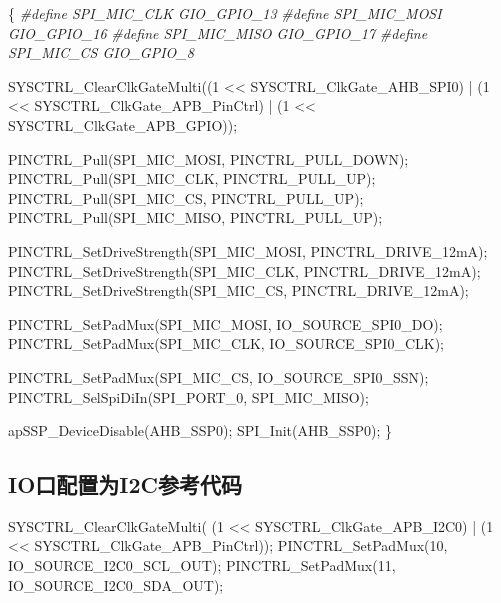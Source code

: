 \documentclass[
  12pt,
]{book}
\newenvironment{Shaded}{\begin{snugshade}}{\end{snugshade}}
\newcommand{\DecValTok}[1]{\textcolor[rgb]{0.00,0.00,0.81}{#1}}
\newcommand{\NormalTok}[1]{#1}
\newcommand{\PreprocessorTok}[1]{\textcolor[rgb]{0.56,0.35,0.01}{\textit{#1}}}
\begin{document}
\begin{Shaded}
\begin{Highlighting}[]
\NormalTok{\{}
  \PreprocessorTok{#define SPI_MIC_CLK         GIO_GPIO_13}
  \PreprocessorTok{#define SPI_MIC_MOSI        GIO_GPIO_16}
  \PreprocessorTok{#define SPI_MIC_MISO        GIO_GPIO_17}
  \PreprocessorTok{#define SPI_MIC_CS          GIO_GPIO_8}

\NormalTok{  SYSCTRL_ClearClkGateMulti((}\DecValTok{1}\NormalTok{ << SYSCTRL_ClkGate_AHB_SPI0)}
\NormalTok{                              | (}\DecValTok{1}\NormalTok{ << SYSCTRL_ClkGate_APB_PinCtrl)}
\NormalTok{                              | (}\DecValTok{1}\NormalTok{ << SYSCTRL_ClkGate_APB_GPIO));}

\NormalTok{  PINCTRL_Pull(SPI_MIC_MOSI, PINCTRL_PULL_DOWN);}
\NormalTok{  PINCTRL_Pull(SPI_MIC_CLK, PINCTRL_PULL_UP);}
\NormalTok{  PINCTRL_Pull(SPI_MIC_CS, PINCTRL_PULL_UP);}
\NormalTok{  PINCTRL_Pull(SPI_MIC_MISO, PINCTRL_PULL_UP);}

\NormalTok{  PINCTRL_SetDriveStrength(SPI_MIC_MOSI, PINCTRL_DRIVE_12mA);}
\NormalTok{  PINCTRL_SetDriveStrength(SPI_MIC_CLK, PINCTRL_DRIVE_12mA);}
\NormalTok{  PINCTRL_SetDriveStrength(SPI_MIC_CS, PINCTRL_DRIVE_12mA);}

\NormalTok{  PINCTRL_SetPadMux(SPI_MIC_MOSI, IO_SOURCE_SPI0_DO);}
\NormalTok{  PINCTRL_SetPadMux(SPI_MIC_CLK, IO_SOURCE_SPI0_CLK);}
    
\NormalTok{  PINCTRL_SetPadMux(SPI_MIC_CS, IO_SOURCE_SPI0_SSN);}
\NormalTok{  PINCTRL_SelSpiDiIn(SPI_PORT_0, SPI_MIC_MISO);}

\NormalTok{  apSSP_DeviceDisable(AHB_SSP0);}
\NormalTok{  SPI_Init(AHB_SSP0);}
\NormalTok{\}}
\end{Highlighting}
\end{Shaded}

\hypertarget{ioux53e3ux914dux7f6eux4e3ai2cux53c2ux8003ux4ee3ux7801}{%
\subsection{IO口配置为I2C参考代码}\label{ioux53e3ux914dux7f6eux4e3ai2cux53c2ux8003ux4ee3ux7801}}

\begin{Shaded}
\begin{Highlighting}[]
\NormalTok{SYSCTRL_ClearClkGateMulti(  (}\DecValTok{1}\NormalTok{ << SYSCTRL_ClkGate_APB_I2C0)}
\NormalTok{                              | (}\DecValTok{1}\NormalTok{ << SYSCTRL_ClkGate_APB_PinCtrl));}
\NormalTok{PINCTRL_SetPadMux(}\DecValTok{10}\NormalTok{, IO_SOURCE_I2C0_SCL_OUT);}
\NormalTok{PINCTRL_SetPadMux(}\DecValTok{11}\NormalTok{, IO_SOURCE_I2C0_SDA_OUT);}
\end{Highlighting}
\end{Shaded}
\end{document}

